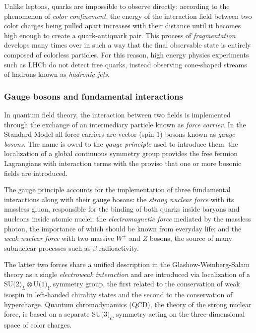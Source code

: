 Unlike leptons, quarks are impossible to observe directly: according to the phenomenon of \textit{color confinement}, the energy of the interaction field between two color charges being pulled apart increases with their distance until it becomes high enough to create a quark-antiquark pair.
This process of \textit{fragmentation} develops many times over in such a way that the final observable state is entirely composed of colorless particles.
For this reason, high energy physics experiments such as LHCb do not detect free quarks, instead observing cone-shaped streams of hadrons known as \textit{hadronic jets}.

\subsubsection{Gauge bosons and fundamental interactions}
In quantum field theory, the interaction between two fields is implemented through the exchange of an intermediary particle known as \textit{force carrier}.
In the Standard Model all force carriers are vector (spin $1$) bosons known as \textit{gauge bosons}.
The name is owed to the \textit{gauge principle} used to introduce them: the localization of a global continuous symmetry group provides the free fermion Lagrangians with interaction terms with the proviso that one or more bosonic fields are introduced.


The gauge principle accounts for the implementation of three fundamental interactions along with their gauge bosons: 
the \textit{strong nuclear force} with its massless gluon, responsible for the binding of both quarks inside baryons and nucleons inside atomic nuclei; the \textit{electromagnetic force} mediated by the massless photon, the importance of which should be known from everyday life; and the \textit{weak nuclear force} with two massive $W^\pm$ and $Z$ bosons, the source of many subnuclear processes such as $\beta$ radioactivity.

The latter two forces share a unified description in the Glashow-Weinberg-Salam theory as a single \textit{electroweak interaction} and are introduced via localization of a $\text{SU(2)}_L \otimes \text{U(1)}_Y$ symmetry group, the first related to the conservation of weak isospin in left-handed chirality states and the second to the conservation of hypercharge.
Quantum chromodynamics (QCD), the theory of the strong nuclear force, is based on a separate $\text{SU(3)}_C$ symmetry acting on the three-dimensional space of color charges.

